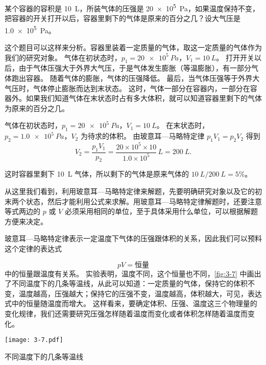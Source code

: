 \medskip
\begin{example}
某个容器的容积是 \qty{10}{L}，所装气体的压强是 \qty{20e5}{Pa}，如果温度保持不变，把容器的开关打开以后，容器里剩下的气体是原来的百分之几？设大气压是  \qty{1.0e5}{Pa}。
\end{example}

\begin{solution}
这个题目可以这样来分析。容器里装着一定质量的气体，取这一定质量的气体作为我们的研究对象。
气体在初状态时，$p_1=\qty{20e5}{Pa}$，$V_1=\qty{10}{L}$。
打开开关以后，由于气体压强大于外界大气压，于是气体发生膨胀（等温膨胀），有一部分气体跑出容器。
随着气体的膨胀，气体的压强降低。
最后，当气体压强等于外界大气压时，气体停止膨胀而达到末状态。
这时，气体一部分在容器内，一部分在容器外。如果我们知道气体在末状态时占有多大体积，就可以知道容器里剩下的气体为原来的百分之几。

气体在初状态时，$p_1=\qty{20e5}{Pa}$，$V_1=\qty{10}{L}$。
在末状态时，$p_2=\qty{1.0e5}{Pa}$，$V_2$ 为待求的体积。
由玻意耳—马略特定律 $p_1V_1=p_2V_2$ 得到
\[V_2=\frac{p_1V_1}{p_2}=\frac{20\times 10^5\times 10}{1.0\times 10^5}\,\unit{ L}=\qty{200}{L}.\]

这时容器里剩下 \qty{10}{L} 气体，所以剩下的气体是原来气体的 $\qty{10}{L}/\qty{200}{L}=5\%$。
\end{solution}

从这里我们看到，利用玻意耳—马略特定律来解题，先要明确研究对象以及它的初末两个状态，然后才能利用公式来求解。用玻意耳—马略特定律解题时，还要注意等式两边的 $p$ 或 $V$ 必须采用相同的单位，至于具体采用什么单位，可以根据解题方便来决定。

玻意耳—马略特定律表示一定温度下气体的压强跟体积的关系，因此我们可以预料这个定律的表达式

\medskip\noindent
\begin{minipage}{0.55\linewidth}%
\[pV=\text{恒量} \]
中的恒量跟温度有关系。
实验表明，温度不同，这个恒量也不同，\cref{fig:3-7} 中画出了不同温度下的几条等温线，从此可以知道：一定质量的气体，保持它的体积不变，温度越高，压强越大；保持它的压强不变，温度越高，体积越大，可见，表达式中的恒量随温度而增大。
这样看来，要确定体积、压强、温度这三个物理量的变化规律，我们还需要研究压强怎样随着温度而变化或者体积怎样随着温度而变化。
\end{minipage}\hfill
\begin{minipage}{0.4\linewidth}\centering
\begin{figurehere}
	\texttt{[image: 3-7.pdf]}
	\caption{不同温度下的几条等温线}\label{fig:3-7}
\end{figurehere}
\end{minipage}

